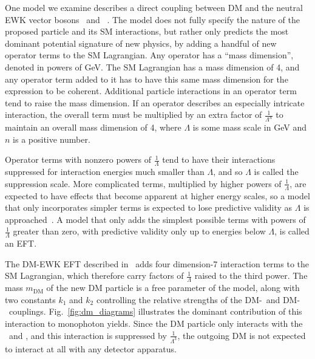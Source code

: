 \documentclass[oneside, letterpaper, 12pt, oldfontcommands]{memoir}
\begin{document}
One model we examine describes a direct coupling between DM and the neutral EWK vector bosons \PZ\ and \Pgamma~\cite{ref:PhysRevD.89.056011}. The model does not fully specify
the nature of the proposed particle and its SM interactions, but rather only predicts the most dominant potential signature of new physics,
by adding a handful of new operator terms to the SM Lagrangian. Any operator has a ``mass dimension'', denoted in powers of GeV. The SM Lagrangian has
a mass dimension of 4, and any operator term added to it has to have this same mass dimension for the expression to be coherent.
Additional particle interactions in an operator term tend to raise the mass dimension. If an operator describes an especially intricate interaction,
the overall term must be multiplied by an extra factor of $\frac{1}{\Lambda^{n}}$ to maintain an overall mass dimension of 4, where $\Lambda$ is some mass
scale in GeV and $n$ is a positive number.

Operator terms with nonzero powers of $\frac{1}{\Lambda}$ tend to have their interactions suppressed for interaction energies much
smaller than $\Lambda$, and so $\Lambda$ is called the suppression scale. More complicated terms, multiplied by higher powers of $\frac{1}{\Lambda}$,
are expected to have effects that become apparent at higher energy scales, so a model that only incorporates simpler terms is expected to
lose predictive validity as $\Lambda$ is approached~\cite{ref:j.aop.2013.04.016}. A model that only adds the simplest possible terms with powers of
$\frac{1}{\Lambda}$ greater than zero, with predictive validity only up to energies below $\Lambda$, is called an EFT.

The DM-EWK EFT described in~\cite{ref:PhysRevD.89.056011} adds four dimension-7 interaction terms to the SM Lagrangian, which therefore carry factors of $\frac{1}{\Lambda}$
raised to the third power. The mass $m_\mathrm{DM}$ of the new DM particle is a free parameter of the model, along with two constants $k_1$ and $k_2$ controlling
the relative strengths of the DM-\PZ\ and DM-\Pgamma\ couplings.
Fig.~\ref{fig:dm_diagrams} illustrates the dominant contribution of this interaction to monophoton yields. Since the DM
particle only interacts with the \PZ\ and \Pgamma, and this interaction is suppressed by $\frac{1}{\Lambda^{3}}$, the outgoing DM is not expected to interact at all
with any detector apparatus.
\end{document}
